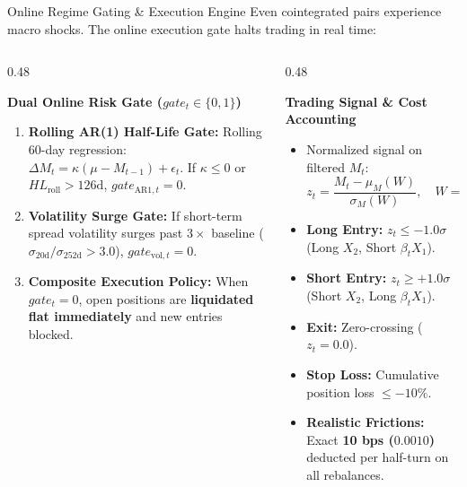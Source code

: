 \documentclass[10pt, aspectratio=169]{beamer}
\begin{document}
\begin{frame}{Online Regime Gating \& Execution Engine}
  Even cointegrated pairs experience macro shocks. The online execution gate halts trading in real time:
  \vspace{4pt}
  \begin{columns}[T]
    \begin{column}{0.48\textwidth}
      \begin{block}{\textbf{Dual Online Risk Gate ($gate_t \in \{0, 1\}$)}}
        \begin{enumerate}
          \item \textbf{Rolling AR(1) Half-Life Gate:}
                Rolling 60-day regression: $\Delta M_t = \kappa (\mu - M_{t-1}) + \epsilon_t$.
                If $\kappa \le 0$ or $HL_{\text{roll}} > 126\text{d}$, $gate_{\text{AR1},t} = 0$.
          \item \textbf{Volatility Surge Gate:}
                If short-term spread volatility surges past $3\times$ baseline ($\sigma_{20\text{d}} / \sigma_{252\text{d}} > 3.0$), $gate_{\text{vol},t} = 0$.
          \item \textbf{Composite Execution Policy:}
                When $gate_t = 0$, open positions are \textbf{liquidated flat immediately} and new entries blocked.
        \end{enumerate}
      \end{block}
    \end{column}
    \begin{column}{0.48\textwidth}
      \begin{block}{\textbf{Trading Signal \& Cost Accounting}}
        \begin{itemize}
          \item Normalized signal on filtered $M_t$:
          \[
            z_t = \frac{M_t - \mu_M(W)}{\sigma_M(W)}, \quad W = 80\text{ days}
          \]
          \item \textbf{Long Entry:} $z_t \le -1.0\sigma$ (Long $X_2$, Short $\beta_t X_1$).
          \item \textbf{Short Entry:} $z_t \ge +1.0\sigma$ (Short $X_2$, Long $\beta_t X_1$).
          \item \textbf{Exit:} Zero-crossing ($z_t = 0.0$).
          \item \textbf{Stop Loss:} Cumulative position loss $\le -10\%$.
          \item \textbf{Realistic Frictions:} Exact \textbf{10 bps ($0.0010$)} deducted per half-turn on all rebalances.
        \end{itemize}
      \end{block}
    \end{column}
  \end{columns}
\end{frame}
\end{document}
